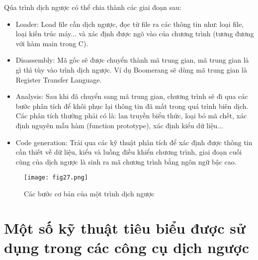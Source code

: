Qúa trình dịch ngược có thể chia thành các giai đoạn sau:
\begin{itemize}
	\item Loader: Load file cần dịch ngược, đọc từ file ra các thông tin như: loại file, loại kiến trúc máy... và xác định được ngõ vào của chương trình (tương đương với hàm main trong C).
	\item Disassembly: Mã gốc sẽ được chuyển thành mã trung gian, mã trung gian là gì thì tùy vào trình dịch ngược. Ví dụ Boomerang sẽ dùng mã trung gian là Register Transfer Language.
	\item Analysis: Sau khi đã chuyển sang mã trung gian, chương trình sẽ đi qua các bước phân tích để khôi phục lại thông tin đã mất trong quá trình biên dịch. Các phân tích thường phải có là: lan truyền biểu thức, loại bỏ mã chết, xác định nguyên mẫu hàm (function prototype), xác định kiểu dữ liệu...
	\item Code generation: Trải qua các kỹ thuật phân tích để xác định được thông tin cần thiết về dữ liệu, kiểu và luồng điều khiển chương trình, giai đoạn cuối cùng của dịch ngược là sinh ra mã chương trình bằng ngôn ngữ bậc cao. 
\end{itemize}
\begin{figure}[h]
	\centering
	\texttt{[image: fig27.png]}
	\caption{Các bước cơ bản của một trình dịch ngược}
\end{figure}
\section{Một số kỹ thuật tiêu biểu được sử dụng trong các công cụ dịch ngược}
